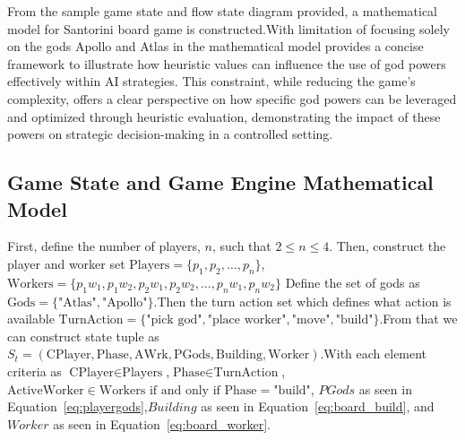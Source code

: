 \documentclass{telkomnika}
\begin{document}
From the sample game state and flow state diagram provided, a mathematical model for Santorini board game is constructed.With limitation of focusing solely on the gods Apollo and Atlas in the mathematical model provides a concise framework to illustrate how heuristic values can influence the use of god powers effectively within AI strategies. This constraint, while reducing the game's complexity, offers a clear perspective on how specific god powers can be leveraged and optimized through heuristic evaluation, 
demonstrating the impact of these powers on strategic decision-making in a controlled setting.

\subsection{Game State and Game Engine Mathematical Model}
First, define the number of players, \(n\), such that \(2 \leq n \leq 4\). Then, construct the player and worker set \( \text{Players} = \{p_1, p_2, \ldots, p_n\} \),\(\text{Workers} = \{p_{1}w_{1},p_{1}w_{2},p_{2}w_{1},p_{2}w_{2}, \ldots, p_{n}w_{1},p_{n}w_{2}\}\) Define the set of gods as \(\text{Gods} = \{\text{"Atlas"}, \text{"Apollo"}\}\).Then the turn action set which defines what action is available \(\text{TurnAction} = \{\text{"pick god"}, \text{"place worker"}, \text{"move"}, \text{"build"}\}\).From that we can construct state tuple as \(S_t = (\text{CPlayer}, \text{Phase}, \text{AWrk}, \text{PGods}, \text{Building}, \text{Worker})\).With each element criteria as \(\text{CPlayer} \in \text{Players}\),\(\text{Phase} \in \text{TurnAction}\),\(\text{ActiveWorker} \in \text{Workers} \text{ if and only if } \text{Phase} = \text{"build"}\), \(PGods\) as seen in Equation~\ref{eq:playergods},\(Building\) as seen in Equation~\ref{eq:board_build}, and \(Worker\) as seen in Equation~\ref{eq:board_worker}.
\end{document}
